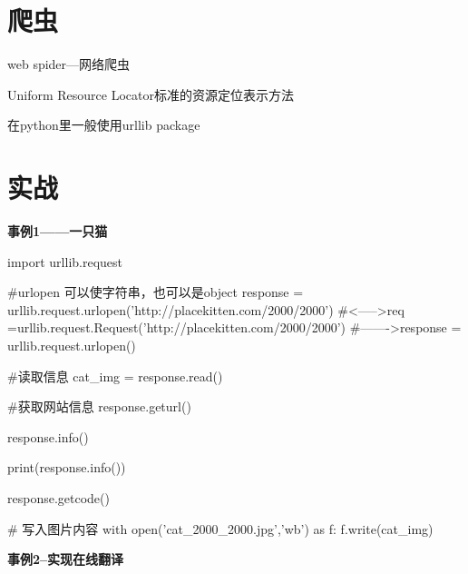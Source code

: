 \documentclass[a4paper,10pt]{ctexart}
\begin{document}

\section{爬虫}
web spider---网络爬虫

Uniform Resource Locator标准的资源定位表示方法\\

在python里一般使用urllib package
\section{实战}
\textbf{事例1——一只猫}\\

\begin{python}
import urllib.request

#urlopen 可以使字符串，也可以是object
response = urllib.request.urlopen('http://placekitten.com/2000/2000')
#<----->req =urllib.request.Request('http://placekitten.com/2000/2000')
#------->response = urllib.request.urlopen()

#读取信息
cat_img = response.read()

#获取网站信息
response.geturl()

response.info()

print(response.info())

response.getcode()

# 写入图片内容
with open('cat_2000_2000.jpg','wb') as f:
      f.write(cat_img)
\end{python}

\textbf{事例2--实现在线翻译}\\
\end{document}
